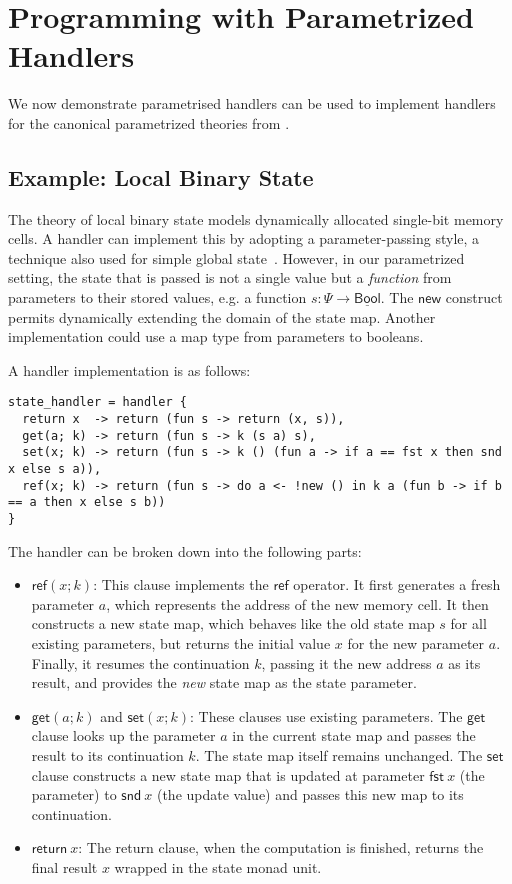 \documentclass{article}
\theoremstyle{definition}
\theoremstyle{remark}
\newcommand\new{\mathsf{new}}
\newcommand\bool{\mathsf{Bool}}
\newcommand\comp[1]{\underline{#1}}
\newcommand\ret[1]{{\mathsf{return} \ #1}}
\newcommand\get{\mathsf{get}}
\newcommand\set{\mathsf{set}}
\newcommand\newref{\mathsf{ref}}
\newcommand\fst[1]{{\mathsf{fst} \ #1}}
\newcommand\snd[1]{{\mathsf{snd} \ #1}}
\begin{document}
\section{Programming with Parametrized Handlers}

We now demonstrate parametrised handlers can be used to implement handlers for the canonical parametrized theories from .

\subsection{Example: Local Binary State}

The theory of local binary state models dynamically allocated single-bit memory cells.
A handler can implement this by adopting a parameter-passing style, a technique also used for simple global state~\cite{pretnar_introduction_2015}.
However, in our parametrized setting, the state that is passed is not a single value but a \emph{function} from parameters to their stored values,
e.g. a function $s: \Psi \rightarrow \comp \bool$. The $\new$ construct permits dynamically extending the domain of the state map.
Another implementation could use a map type from parameters to booleans.

A handler implementation is as follows:

\begin{lstlisting}
state_handler = handler {
  return x  -> return (fun s -> return (x, s)),
  get(a; k) -> return (fun s -> k (s a) s),
  set(x; k) -> return (fun s -> k () (fun a -> if a == fst x then snd x else s a)),
  ref(x; k) -> return (fun s -> do a <- !new () in k a (fun b -> if b == a then x else s b))
}
\end{lstlisting}

The handler can be broken down into the following parts:
\begin{itemize}
    \item $\newref(x; k)$: This clause implements the $\newref$ operator.
      It first generates a fresh parameter $a$, which represents the address of the new memory cell.
      It then constructs a new state map, which behaves like the old state map $s$ for all existing parameters, but returns the initial value $x$ for the new parameter $a$.
      Finally, it resumes the continuation $k$, passing it the new address $a$ as its result, and provides the \emph{new} state map as the state parameter.
    \item $\get(a; k)$ and $\set(x; k)$: These clauses use existing parameters.
      The $\get$ clause looks up the parameter $a$ in the current state map and passes the result to its continuation $k$. The state map itself remains unchanged.
      The $\set$ clause constructs a new state map that is updated at parameter $\fst x$ (the parameter) to $\snd x$ (the update value) and passes this new map to its continuation.
    \item $\ret{x}$: The return clause, when the computation is finished, returns the final result $x$ wrapped in the state monad unit.
\end{itemize}
\end{document}
